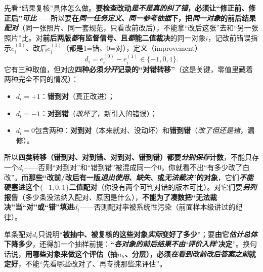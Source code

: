 先看“结果复核”具体怎么做。\textbf{要检查改动\emph{是不是真的纠了错}，必须让“修正前、修正后”\emph{可比}}——所以要\textbf{在\emph{同一任务定义}、\emph{同一参考依据}下，把\emph{同一对象}的前后结果\emph{配对}}（同一张照片、同一套规范，只看改前改后），不能拿“改后这张”去和“另一张照片”比。对\textbf{前后两版\emph{都}有监督信号、且\emph{都}能二值裁决}的同一对象$i$，记改前错误指示$e_i^{(0)}$、改后$e_i^{(1)}$（都是1=错、0=对），定义（improvement）
$$d_i=e_i^{(0)}-e_i^{(1)}\in\{-1,0,1\}.$$
它有三种取值，但对应\textbf{四种必须\emph{分开}记录的“对错转移”}（这是关键，零值里藏着两种完全不同的情况）：
\begin{itemize}\item $d_i=+1$：\textbf{错到对}（真正改进）；\item $d_i=-1$：\textbf{对到错}（\emph{改坏了}，新引入的错误）；\item $d_i=0$包含两种：\textbf{对到对}（本来就对、没动坏）和\textbf{错到错}（\emph{改了但还是错}，漏修）。\end{itemize}
所以\textbf{四类转移（错到对、对到错、对到对、错到错）都要\emph{分别保存}计数}，不能只存一个$d_i$——否则“对到对”和“错到错”被混成同一个0，你就看不出“有多少改了白改”。而\textbf{那些“改前/改后有一版\emph{退出使用}、\emph{缺失}、或\emph{无法裁决}”的对象}，它们\textbf{\emph{不能}硬塞进这个$\{-1,0,1\}$二值配对}（你没有两个可判对错的版本可比）。对它们要\textbf{\emph{另列}报告}（多少条没法纳入配对、原因是什么），\textbf{不能为了凑数把“无法裁决”当“对”或“错”填进$d_i$}——否则配对率被系统性污染（前面样本级讲过的纪律）。

单条配对$d_i$只说明“\textbf{被抽中、被复核的这些对象\emph{实际}变好了多少}”；要\textbf{由它\emph{估计总体}下降多少}，还得加一个抽样前提：\textbf{“\emph{各对象的前后结果}\emph{不由‘评价入样}’决定}”。换句话说，\textbf{用哪些对象来做这个评估（抽$n_h$、分层），必须\emph{在看到改前改后答案之前}就定好}，不能“先看哪些改对了、再专挑那些来评估”。


